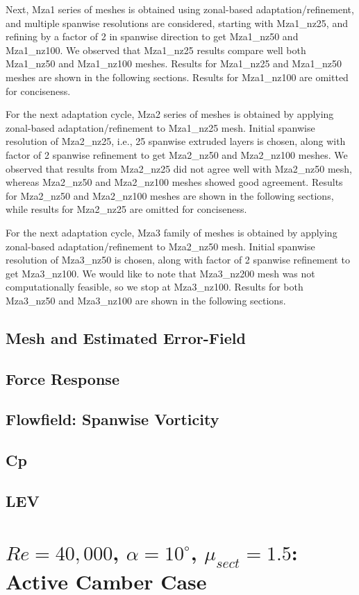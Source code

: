 Next, Mza1 series of meshes is obtained using zonal-based adaptation/refinement, and multiple spanwise resolutions are considered, starting with Mza1\_nz25, and refining by a factor of 2 in spanwise direction to get Mza1\_nz50 and Mza1\_nz100.
We observed that Mza1\_nz25 results compare well both Mza1\_nz50 and Mza1\_nz100 meshes.
Results for Mza1\_nz25 and Mza1\_nz50 meshes are shown in the following sections.
Results for Mza1\_nz100 are omitted for conciseness.

For the next adaptation cycle, Mza2 series of meshes is obtained by applying  zonal-based adaptation/refinement to Mza1\_nz25 mesh.
Initial spanwise resolution of Mza2\_nz25, i.e., 25 spanwise extruded layers is chosen, along with factor of 2 spanwise refinement to get Mza2\_nz50 and Mza2\_nz100 meshes. 
We observed that results from Mza2\_nz25 did not agree well with Mza2\_nz50 mesh, whereas Mza2\_nz50 and Mza2\_nz100 meshes showed good agreement.
Results for Mza2\_nz50 and Mza2\_nz100 meshes are shown in the following sections, while results for Mza2\_nz25 are omitted for conciseness.

For the next adaptation cycle, Mza3 family of meshes is obtained by applying  zonal-based adaptation/refinement to Mza2\_nz50 mesh. 
Initial spanwise resolution of Mza3\_nz50 is chosen, along with factor of 2 spanwise refinement to get Mza3\_nz100. 
We would like to note that Mza3\_nz200 mesh was not computationally feasible, so we stop at Mza3\_nz100.
Results for both Mza3\_nz50 and Mza3\_nz100 are shown in the following sections.

\subsection{Mesh and Estimated Error-Field}

\label{sec:zonal_mesh_and_error}

\subsection{Force Response}

\label{sec:zonal_force_response}

\subsection{Flowfield: Spanwise Vorticity}

\label{sec:zonal_vorticity}

\subsection{Cp}

\label{sec:zonal_cp}

\subsection{LEV}

\label{sec:zonal_LEV}


\section{ $Re=40,000$,  $\alpha=10^\circ$, $\mu_{sect}=1.5$: Active Camber Case}


\label{sec:zonal_active_camber}

